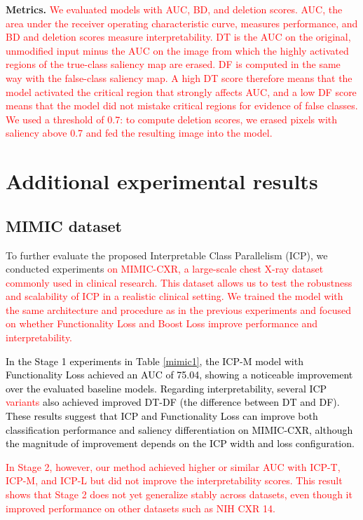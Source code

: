 \documentclass[preprint,7pt, a4paper]{elsarticle}
\begin{document}
\textbf{Metrics.} \textcolor{red}{We evaluated models with AUC, BD, and deletion scores. AUC, the area under the receiver operating characteristic curve, measures performance, and BD and deletion scores measure interpretability. DT is the AUC on the original, unmodified input minus the AUC on the image from which the highly activated regions of the true-class saliency map are erased. DF is computed in the same way with the false-class saliency map. A high DT score therefore means that the model activated the critical region that strongly affects AUC, and a low DF score means that the model did not mistake critical regions for evidence of false classes. We used a threshold of 0.7: to compute deletion scores, we erased pixels with saliency above 0.7 and fed the resulting image into the model.}



\section{Additional experimental results}

\subsection{MIMIC dataset}

To further evaluate the proposed Interpretable Class Parallelism (ICP), we conducted experiments \textcolor{red}{on MIMIC-CXR, a large-scale chest X-ray dataset commonly used in clinical research. This dataset allows us to test the robustness and scalability of ICP in a realistic clinical setting. We trained the model with the same architecture and procedure as in the previous experiments and focused on whether Functionality Loss and Boost Loss improve performance and interpretability.}

\textcolor{black}{In the Stage 1 experiments in Table \ref{mimic1}, the ICP-M model with Functionality Loss achieved an AUC of 75.04, showing a noticeable improvement over the evaluated baseline models. Regarding interpretability, several ICP \textcolor{red}{variants} also achieved improved DT-DF (the difference between DT and DF). These results suggest that ICP and Functionality Loss can improve both classification performance and saliency differentiation on MIMIC-CXR, although the magnitude of improvement depends on the ICP width and loss configuration.}

\textcolor{red}{In Stage 2, however, our method achieved higher or similar AUC with ICP-T, ICP-M, and ICP-L but did not improve the interpretability scores. This result shows that Stage 2 does not yet generalize stably across datasets, even though it improved performance on other datasets such as NIH CXR 14.}
\end{document}
